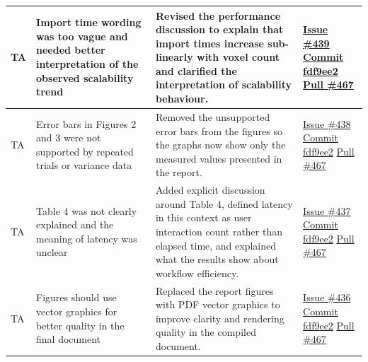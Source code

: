 \documentclass[12pt, titlepage]{article}
\begin{document}
\begin{longtable}{|p{2cm}|p{4cm}|p{5cm}|p{3cm}|}
TA & Import time wording was too vague and needed better interpretation of the observed scalability trend & Revised the performance discussion to explain that import times increase sub-linearly with voxel count and clarified the interpretation of scalability behaviour. & \href{https://github.com/OmarHassanAdelhamid/Five-of-a-Kind-capstone-project-/issues/439}{Issue \#439}
\newline\href{https://github.com/OmarHassanAdelhamid/Five-of-a-Kind-capstone-project-/commit/fdf9ee2}{Commit fdf9ee2}
\newline\href{https://github.com/OmarHassanAdelhamid/Five-of-a-Kind-capstone-project-/pull/467}{Pull \#467} \\ \hline

TA & Error bars in Figures 2 and 3 were not supported by repeated trials or variance data & Removed the unsupported error bars from the figures so the graphs now show only the measured values presented in the report. & \href{https://github.com/OmarHassanAdelhamid/Five-of-a-Kind-capstone-project-/issues/438}{Issue \#438}
\newline\href{https://github.com/OmarHassanAdelhamid/Five-of-a-Kind-capstone-project-/commit/fdf9ee2}{Commit fdf9ee2}
\newline\href{https://github.com/OmarHassanAdelhamid/Five-of-a-Kind-capstone-project-/pull/467}{Pull \#467} \\ \hline

TA & Table 4 was not clearly explained and the meaning of latency was unclear & Added explicit discussion around Table 4, defined latency in this context as user interaction count rather than elapsed time, and explained what the results show about workflow efficiency. & \href{https://github.com/OmarHassanAdelhamid/Five-of-a-Kind-capstone-project-/issues/437}{Issue \#437}
\newline\href{https://github.com/OmarHassanAdelhamid/Five-of-a-Kind-capstone-project-/commit/fdf9ee2}{Commit fdf9ee2}
\newline\href{https://github.com/OmarHassanAdelhamid/Five-of-a-Kind-capstone-project-/pull/467}{Pull \#467} \\ \hline

TA & Figures should use vector graphics for better quality in the final document & Replaced the report figures with PDF vector graphics to improve clarity and rendering quality in the compiled document. & \href{https://github.com/OmarHassanAdelhamid/Five-of-a-Kind-capstone-project-/issues/436}{Issue \#436}
\newline\href{https://github.com/OmarHassanAdelhamid/Five-of-a-Kind-capstone-project-/commit/fdf9ee2}{Commit fdf9ee2}
\newline\href{https://github.com/OmarHassanAdelhamid/Five-of-a-Kind-capstone-project-/pull/467}{Pull \#467} \\ \hline


\end{longtable}
\end{document}

